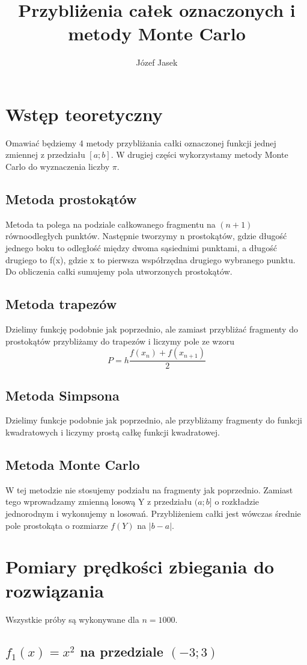 \documentclass{article}
\title{Przybliżenia całek oznaczonych i metody Monte Carlo}
\author{Józef Jasek}
\begin{document}
\maketitle

\section{Wstęp teoretyczny}
    Omawiać będziemy 4 metody przybliżania całki oznaczonej funkcji jednej zmiennej z przedziału $[a;b]$. W drugiej części wykorzystamy metody Monte Carlo do wyznaczenia liczby $\pi$.
    \subsection{Metoda prostokątów}
    Metoda ta polega na podziale całkowanego fragmentu na $(n+1)$ równoodległych punktów. Następnie tworzymy n prostokątów, gdzie długość jednego boku to odległość między dwoma sąsiednimi punktami, a długość drugiego to f(x), gdzie x to pierwsza współrzędna drugiego wybranego punktu. Do obliczenia całki sumujemy pola utworzonych prostokątów.
    \subsection{Metoda trapezów}
    Dzielimy funkcję podobnie jak poprzednio, ale zamiast przybliżać fragmenty do prostokątów przybliżamy do trapezów i liczymy pole ze wzoru
    \[ P = h\frac{f(x_n) + f(x_{n+1})}{2} \]
    \subsection{Metoda Simpsona}
    Dzielimy funkcje podobnie jak poprzednio, ale przybliżamy fragmenty do funkcji kwadratowych i liczymy prostą całkę funkcji kwadratowej.
    \subsection{Metoda Monte Carlo}
    W tej metodzie nie stosujemy podziału na fragmenty jak poprzednio. Zamiast tego wprowadzamy zmienną losową Y z przedziału $(a;b]$ o rozkładzie jednorodnym i wykonujemy n losowań. Przybliżeniem całki jest wówczas średnie pole prostokąta o rozmiarze $f(Y)$ na $|b - a|$.
\section{Pomiary prędkości zbiegania do rozwiązania}
Wszystkie próby są wykonywane dla $n = 1000$.
    \subsection{$f_1(x) = x^2$ na przedziale $(-3;3)$}
        
\end{document}
